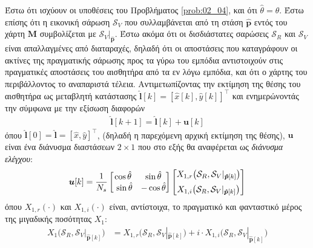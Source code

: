\begin{bw_box}
\begin{theorem}
  \label{prop:theorem_without_disturbance}
  Έστω ότι ισχύουν οι υποθέσεις του Προβλήματος \ref{prob:02_04}, και ότι
  $\hat{\theta} = \theta$. Έστω επίσης ότι η εικονική σάρωση $\mathcal{S}_V$ που
  συλλαμβάνεται από τη στάση $\hat{\bm{p}}$ εντός του χάρτη $\bm{M}$
  συμβολίζεται με $\mathcal{S}_V|_{\bm{\hat{p}}}$. Έστω ακόμα ότι οι
  δισδιάστατες σαρώσεις $\mathcal{S}_R$ και $\mathcal{S}_V$ είναι απαλλαγμένες
  από διαταραχές, δηλαδή ότι οι αποστάσεις που καταγράφουν οι ακτίνες της
  πραγματικής σάρωσης προς τα γύρω του εμπόδια αντιστοιχούν στις πραγματικές
  αποστάσεις του αισθητήρα από τα εν λόγω εμπόδια, και ότι ο χάρτης του
  περιβάλλοντος το αναπαριστά τέλεια. Αντιμετωπίζοντας την
  εκτίμηση της θέσης του αισθητήρα ως μεταβλητή κατάστασης
  $\hat{\bm{l}}[k] = [\hat{x}[k], \hat{y}[k]]^\top$ και ενημερώνοντάς την
  σύμφωνα με την εξίσωση διαφορών
  \begin{align}
    \hat{\bm{l}}[k+1] = \hat{\bm{l}}[k] + \bm{u}[k]
    \label{eq:difference_equation_without_disturbance}
  \end{align}
  όπου $\hat{\bm{l}}[0] = \hat{\bm{l}} = [\hat{x}, \hat{y}]^{\top}$,
  (δηλαδή η παρεχόμενη αρχική εκτίμηση της θέσης), $\bm{u}$ είναι ένα διάνυσμα
  διαστάσεων $2 \times 1$ που στο εξής θα αναφέρεται ως
  \textit{διάνυσμα ελέγχου}:
  \begin{align}
    \bm{u}[k] = \dfrac{1}{N_s}
    \begin{bmatrix}
      \cos\hat{\theta} & \sin\hat{\theta} \\\
      \sin\hat{\theta} & - \cos\hat{\theta}
    \end{bmatrix}
    \begin{bmatrix}
      X_{1,r}\big(\mathcal{S}_R, \mathcal{S}_V|_{\bm{\hat{p}}[k]}\big) \vspace{0.2cm} \\
      X_{1,i}\big(\mathcal{S}_R, \mathcal{S}_V|_{\bm{\hat{p}}[k]}\big)
    \end{bmatrix}
    \label{eq:control_vector_without_disturbance}
  \end{align}
  όπου $X_{1,r}(\cdot)$ και $X_{1,i}(\cdot)$ είναι, αντίστοιχα, το πραγματικό
  και φανταστικό μέρος της μιγαδικής ποσότητας $X_1$:
  \begin{align}
    X_1\big(\mathcal{S}_R, \mathcal{S}_V|_{\bm{\hat{p}}[k]}\big) &= X_{1,r}\big(\mathcal{S}_R, \mathcal{S}_V|_{\bm{\hat{p}}[k]}\big)
      + i \cdot X_{1,i}\big(\mathcal{S}_R, \mathcal{S}_V|_{\bm{\hat{p}}[k]}\big) \nonumber \\

\end{align}
\end{theorem}
\end{bw_box}
